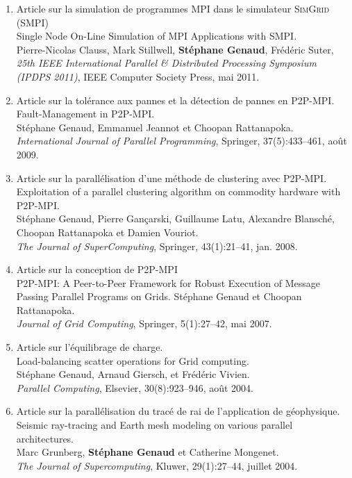 \documentclass[11pt]{article}
\begin{document}
\vspace{1cm}

\begin{enumerate}
\item Article sur la simulation de programmes MPI dans le simulateur \textsc{SimGrid} (SMPI)\\
Single Node On-Line Simulation of MPI Applications with SMPI.\\
Pierre-Nicolas Clauss, Mark Stillwell, \textbf{Stéphane Genaud}, Fr\'ed\'eric Suter,\\
{\em 25th IEEE International Parallel \& Distributed Processing Symposium (IPDPS 2011)}, 
IEEE Computer Society Press, mai 2011.\\


\item Article sur la tolérance aux pannes et la détection de pannes en P2P-MPI.\\ 
Fault-Management in P2P-MPI.\\
Stéphane Genaud, Emmanuel Jeannot et Choopan Rattanapoka.\\
{\em International Journal of Parallel Programming}, Springer, 37(5):433--461, août 2009.\\


\item Article sur la parallélisation d'une méthode de clustering avec P2P-MPI.\\
Exploitation of a parallel clustering algorithm on commodity hardware with P2P-MPI.\\
Stéphane Genaud, Pierre Gançarski, Guillaume Latu, Alexandre Blansché, Choopan Rattanapoka et Damien Vouriot.\\
{\em The Journal of SuperComputing}, Springer, 43(1):21--41, jan. 2008.\\


\item Article sur la conception de P2P-MPI\\
P2P-MPI: A Peer-to-Peer Framework for Robust Execution of Message Passing Parallel Programs on Grids.
Stéphane Genaud et Choopan Rattanapoka.\\
{\em Journal of Grid Computing}, Springer, 5(1):27--42, mai 2007.\\


\item Article sur l'équilibrage de charge.\\
Load-balancing scatter operations for Grid computing.\\
Stéphane Genaud, Arnaud Giersch, et Frédéric Vivien.\\
{\em Parallel Computing}, Elsevier, 30(8):923--946, août 2004.\\


\item Article sur la parallélisation du tracé de rai de l'application de géophysique.\\
Seismic ray-tracing and Earth mesh modeling on various parallel architectures.\\
Marc Grunberg, \textbf{Stéphane Genaud} et Catherine Mongenet.\\
{\em The Journal of Supercomputing}, Kluwer, 29(1):27--44, juillet 2004.\\
\end{enumerate}
\end{document}
